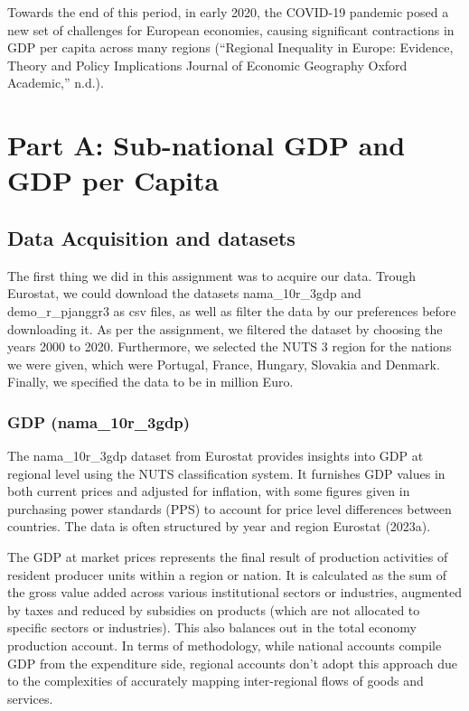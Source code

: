 \documentclass[
  a4paper,
  DIV=11,
  numbers=noendperiod]{scrartcl}
\begin{document}
Towards the end of this period, in early 2020, the COVID-19 pandemic
posed a new set of challenges for European economies, causing
significant contractions in GDP per capita across many regions
({``Regional Inequality in Europe: Evidence, Theory and Policy
Implications \textbar{} Journal of Economic Geography \textbar{} Oxford
Academic,''} n.d.).

\hypertarget{part-a-sub-national-gdp-and-gdp-per-capita}{%
\section{Part A: Sub-national GDP and GDP per
Capita}\label{part-a-sub-national-gdp-and-gdp-per-capita}}

\hypertarget{data-acquisition-and-datasets}{%
\subsection{Data Acquisition and
datasets}\label{data-acquisition-and-datasets}}

The first thing we did in this assignment was to acquire our data.
Trough Eurostat, we could download the datasets nama\_10r\_3gdp and
demo\_r\_pjanggr3 as csv files, as well as filter the data by our
preferences before downloading it. As per the assignment, we filtered
the dataset by choosing the years 2000 to 2020. Furthermore, we selected
the NUTS 3 region for the nations we were given, which were Portugal,
France, Hungary, Slovakia and Denmark. Finally, we specified the data to
be in million Euro.

\hypertarget{gdp-nama_10r_3gdp}{%
\subsubsection{GDP (nama\_10r\_3gdp)}\label{gdp-nama_10r_3gdp}}

The nama\_10r\_3gdp dataset from Eurostat provides insights into GDP at
regional level using the NUTS classification system. It furnishes GDP
values in both current prices and adjusted for inflation, with some
figures given in purchasing power standards (PPS) to account for price
level differences between countries. The data is often structured by
year and region Eurostat (2023a).

The GDP at market prices represents the final result of production
activities of resident producer units within a region or nation. It is
calculated as the sum of the gross value added across various
institutional sectors or industries, augmented by taxes and reduced by
subsidies on products (which are not allocated to specific sectors or
industries). This also balances out in the total economy production
account. In terms of methodology, while national accounts compile GDP
from the expenditure side, regional accounts don't adopt this approach
due to the complexities of accurately mapping inter-regional flows of
goods and services.
\end{document}
